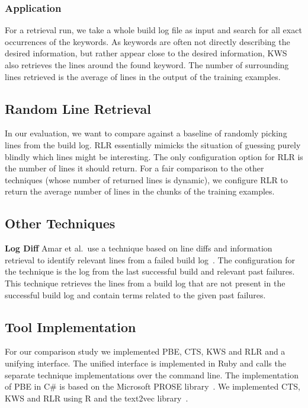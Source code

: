 \subsubsection{Application}
For a retrieval run, we take a whole build log file as input and
search for all exact occurrences of the keywords.
As keywords are
often not directly describing the desired information, but rather
appear close to the desired information, KWS also retrieves the lines
around the found keyword.
The number of surrounding lines retrieved is
the average of lines in the output of the training examples.


\subsection{Random Line Retrieval}
\label{sec:expl-rlr}
In our evaluation, we want to compare against a baseline of randomly
picking lines from the build log.
RLR essentially mimicks the
situation of guessing purely blindly which lines might be interesting.
The only configuration option for RLR is the number of lines it should
return.
For a fair comparison to the other techniques (whose number of
returned lines is dynamic), we configure RLR to return the average
number of lines in the chunks of the training examples.


\subsection{Other Techniques}

\noindent
\textbf{Log Diff}
Amar et al.\ use a technique based on line diffs and information
retrieval to identify relevant lines from a failed build
log~\cite{amar2019mining}.
The configuration for the technique
is the log from the last successful build and relevant past failures.
This technique retrieves the lines from a build log that are not
present in the successful build log and contain terms related to the
given past failures.


\subsection{Tool Implementation}
For our comparison study we implemented PBE, CTS, KWS and RLR and a
unifying interface.
The unified interface is implemented in Ruby and
calls the separate technique implementations over the command line.
The implementation of PBE in C\# is based on the Microsoft PROSE
library~\cite{prose2019webpage}.
We implemented CTS, KWS and RLR using
R and the text2vec library~\cite{text2vec2019webpage}.


